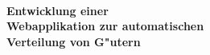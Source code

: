%
%
\begin{titlepage}
\vspace*{13mm}
  \begin{center}

  \vspace{10mm} 
        {\large \hspace{20mm} \Title\\}        
  \vspace{10mm}
       {\Large
          \bf
          \hspace{20mm} Entwicklung einer\\} 
       {\Large
          \bf
          \hspace{20mm} Webapplikation zur automatischen\\}
       {\Large
          \bf
          \hspace{20mm} Verteilung von G"utern\\} 


\end{center}
\end{titlepage}
